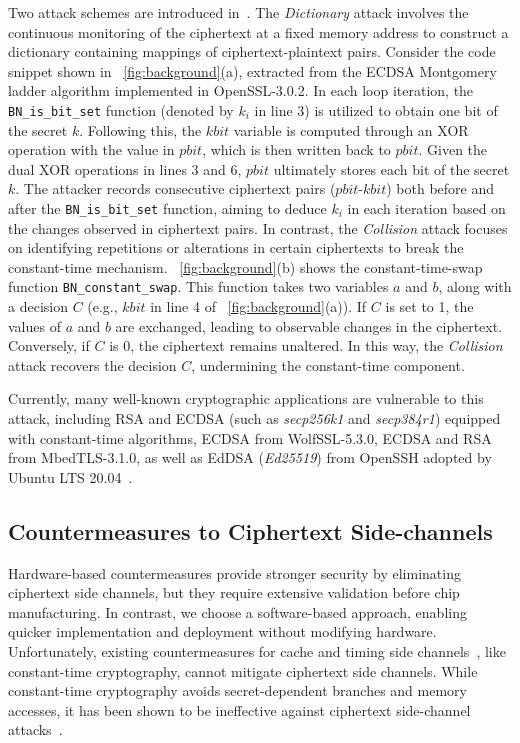 Two attack schemes are introduced in~\cite{li2022systematic}.
The \textit{Dictionary} attack involves the continuous monitoring of the ciphertext at a fixed memory address to construct a dictionary containing mappings of ciphertext-plaintext pairs.
Consider the code snippet shown in \F~\ref{fig:background}(a), extracted from the ECDSA Montgomery ladder algorithm implemented in OpenSSL-3.0.2.
In each loop iteration, the \texttt{BN\_is\_bit\_set} function (denoted by $k_{i}$ in line 3) is utilized to obtain one bit of the secret $k$.
Following this, the $kbit$ variable is computed through an XOR operation with the value in $pbit$, which is then written back to $pbit$.
Given the dual XOR operations in lines 3 and 6, $pbit$ ultimately stores each bit of the secret $k$.
The attacker records consecutive ciphertext pairs ($pbit$-$kbit$) both before and after the \texttt{BN\_is\_bit\_set} function, aiming to deduce $k_{i}$ in each iteration based on the changes observed in ciphertext pairs.
In contrast, the \textit{Collision} attack focuses on identifying repetitions or alterations in certain ciphertexts to break the constant-time mechanism.
\F~\ref{fig:background}(b) shows the constant-time-swap function \texttt{BN\_constant\_swap}.
This function takes two variables $a$ and $b$, along with a decision $C$ (e.g., $kbit$ in line 4 of \F~\ref{fig:background}(a)).
If $C$ is set to 1, the values of $a$ and $b$ are exchanged, leading to observable changes in the ciphertext. Conversely, if $C$ is 0, the ciphertext remains unaltered.
In this way, the \textit{Collision} attack recovers the decision $C$, undermining the constant-time component.

Currently, many well-known cryptographic applications are vulnerable to this attack, including RSA and ECDSA (such as \textit{secp256k1} and \textit{secp384r1}) equipped with constant-time algorithms, ECDSA from WolfSSL-5.3.0, ECDSA and RSA from MbedTLS-3.1.0, as well as EdDSA (\textit{Ed25519}) from OpenSSH adopted by Ubuntu LTS 20.04~\cite{li2021cipherleaks, li2022systematic}.

\subsection{Countermeasures to Ciphertext Side-channels}
\label{subsec:countermeasures}

Hardware-based countermeasures provide stronger security by eliminating ciphertext side channels, but they require extensive validation before chip manufacturing. In contrast, we choose a software-based approach, enabling quicker implementation and deployment without modifying hardware.
Unfortunately, existing countermeasures for cache and timing side channels~\cite{percival2005cache, osvik2006cache, zhang2012cross, yarom2014flush, liu2015last, yarom2014recovering, ryan2019return, aranha2020ladderleak}, like constant-time cryptography, cannot mitigate ciphertext side channels. While constant-time cryptography avoids secret-dependent branches and memory accesses, it has been shown to be ineffective against ciphertext side-channel attacks~\cite{li2021cipherleaks, li2022systematic, deng2023cipherh}.

